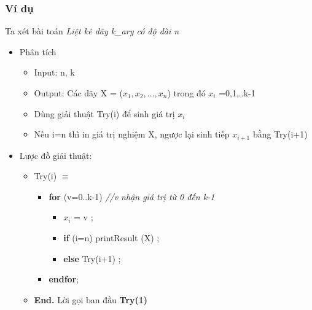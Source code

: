 \subsubsection{Ví dụ}
Ta xét bài toán \textit{Liệt kê dãy k\_ary có độ dài n}
\begin{itemize}
    \item Phân tích
        \begin{itemize}
            \item Input: n, k
            \item Output: Các dãy X = ($x_1, x_2, …,x_n$) trong đó $x_i$ =0,1,..k-1
            \item Dùng giải thuật Try(i) để sinh giá trị $x_i$
            \item Nếu i=n thì in giá trị nghiệm X, ngược lại sinh tiếp $x_{i+1}$ bằng Try(i+1)
        \end{itemize}
    \item Lược đồ giải thuật:
        \begin{itemize}
            \item [] Try(i) $\equiv$
                \begin{itemize}
                    \item [] \textbf{for} (v=0..k-1) \textit{//v nhận giá trị từ 0 đến k-1}
                        \begin{itemize}
                            \item [] $x_i$ = v ;
                            \item [] \textbf{if} (i=n) printResult (X) ;
                            \item [] \textbf{else} Try(i+1) ;
                        \end{itemize}
                    \item [] \textbf{endfor};
                \end{itemize}
            \item [] \enskip \textbf{End.} \hfill Lời gọi ban đầu \textbf{Try(1)}
        \end{itemize}
\end{itemize}
